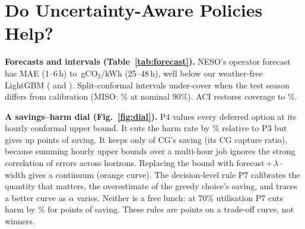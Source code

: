 

\section{Do Uncertainty-Aware Policies Help?}\label{sec:uncertainty}

\textbf{Forecasts and intervals (Table~\ref{tab:forecast}).}
NESO's operator forecast has MAE  (1--6\,h) to
\,gCO$_2$/kWh (25--48\,h), well below our weather-free LightGBM
( and ). Split-conformal intervals
under-cover when the test season differs from calibration (MISO: \% at
nominal 90\%). ACI restores coverage to \%.

\textbf{A savings--harm dial (Fig.~\ref{fig:dial}).}
P4 values every deferred option at its hourly conformal upper bound. It cuts the harm rate by
\% relative to P3 but gives up
 points of saving. It keeps only
 of CG's saving (its CG capture ratio), because summing hourly upper
bounds over a multi-hour job ignores the strong correlation of errors across horizons. Replacing
the bound with forecast\,+\,$\lambda\cdot$width gives a continuum (orange curve). The decision-level
rule P7 calibrates the quantity that matters, the overestimate of the greedy choice's saving, and
traces a better curve as $\alpha$ varies. Neither is a free lunch: at 70\% utilisation P7 cuts harm by
\% for  points of
saving. These rules are points on a trade-off curve, not winners.

